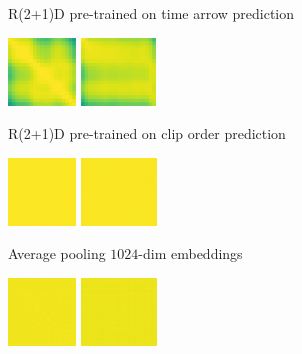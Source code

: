 \documentclass[final]{cvpr}
\begin{document}
\begin{figure}[t]
\begin{subfigure}[t]{0.5\linewidth}
		\vspace{-0.1\baselineskip}
		\caption{\centering R(2+1)D pre-trained on time arrow prediction}
	\end{subfigure}\hfill
	\begin{subfigure}[t]{0.5\linewidth}
		\centering\captionsetup{width=.9\linewidth, justification=raggedright}
		\includegraphics[height=1.8cm]{fig/matrices/a_vcop}
		\includegraphics[height=1.8cm]{fig/matrices/b_vcop}
		\vspace{-0.1\baselineskip}
		\caption{\centering R(2+1)D pre-trained on clip order prediction}
	\end{subfigure}
	\par\medskip
	\begin{subfigure}[t]{0.5\linewidth}
		\centering\captionsetup{width=.9\linewidth, justification=raggedright}
		\includegraphics[height=1.8cm]{fig/matrices/a_avg.png}
		\includegraphics[height=1.8cm]{fig/matrices/b_avg.png}
		\vspace{-0.1\baselineskip}
		\caption{\centering Average pooling $1024$-dim embeddings}
	\end{subfigure}\hfill
	\begin{subfigure}[t]{0.5\linewidth}
		\centering\captionsetup{width=.9\linewidth, justification=raggedright}
		\includegraphics[height=1.8cm]{fig/matrices/a_max.png}
		\includegraphics[height=1.8cm]{fig/matrices/b_max.png}

\end{subfigure}
\end{figure}
\end{document}

